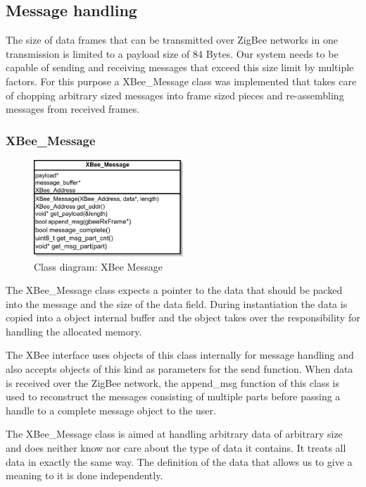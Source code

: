 \subsection{Message handling}
The size of data frames that can be transmitted over ZigBee networks in one transmission is limited to a payload size of 84 Bytes. Our system needs to be capable of sending and receiving messages that exceed this size limit by multiple factors. For this purpose a XBee\_Message class was implemented that takes care of chopping arbitrary sized messages into frame sized pieces and re-assembling messages from received frames. 

\subsubsection{XBee\_Message}
\begin{figure}
\centering
\includegraphics[width=0.5\textwidth]{Images/xbee_message}
\caption{Class diagram: XBee Message}
\label{fig:xbee_message}
\end{figure}

The XBee\_Message class expects a pointer to the data that should be packed into the message and the size of the data field. During instantiation the data is copied into a object internal buffer and the object takes over the responsibility for handling the allocated memory. 

The XBee interface uses objects of this class internally for message handling and also accepts objects of this kind as parameters for the send function. When data is received over the ZigBee network, the append\_msg function of this class is used to reconstruct the messages consisting of multiple parts before passing a handle to a complete message object to the user.

The XBee\_Message class is aimed at handling arbitrary data of arbitrary size and does neither know nor care about the type of data it contains. It treats all data in exactly the same way. The definition of the data that allows us to give a meaning to it is done independently.

